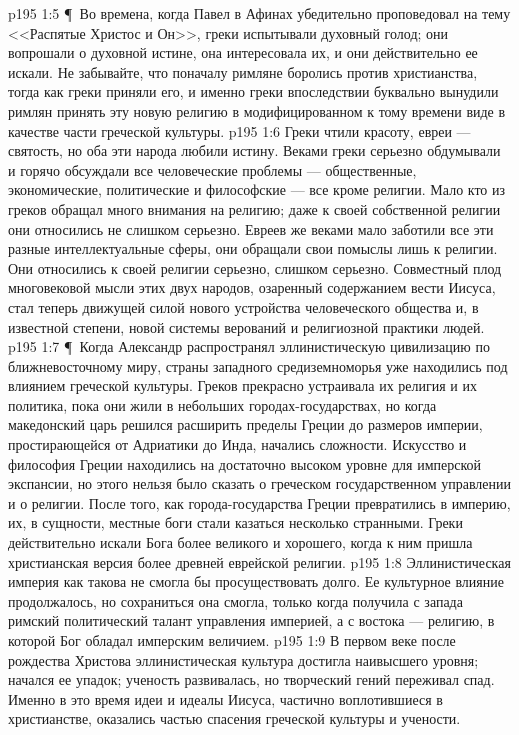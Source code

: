 \vs p195 1:5 \P\ Во времена, когда Павел в Афинах убедительно проповедовал на тему <<Распятые Христос и Он>>, греки испытывали духовный голод; они вопрошали о духовной истине, она интересовала их, и они действительно ее искали. Не забывайте, что поначалу римляне боролись против христианства, тогда как греки приняли его, и именно греки впоследствии буквально вынудили римлян принять эту новую религию в модифицированном к тому времени виде в качестве части греческой культуры.
\vs p195 1:6 Греки чтили красоту, евреи --- святость, но оба эти народа любили истину. Веками греки серьезно обдумывали и горячо обсуждали все человеческие проблемы --- общественные, экономические, политические и философские --- все кроме религии. Мало кто из греков обращал много внимания на религию; даже к своей собственной религии они относились не слишком серьезно. Евреев же веками мало заботили все эти разные интеллектуальные сферы, они обращали свои помыслы лишь к религии. Они относились к своей религии серьезно, слишком серьезно. Совместный плод многовековой мысли этих двух народов, озаренный содержанием вести Иисуса, стал теперь движущей силой нового устройства человеческого общества и, в известной степени, новой системы верований и религиозной практики людей.
\vs p195 1:7 \P\ Когда Александр распространял эллинистическую цивилизацию по ближневосточному миру, страны западного средиземноморья уже находились под влиянием греческой культуры. Греков прекрасно устраивала их религия и их политика, пока они жили в небольших городах\hyp{}государствах, но когда македонский царь решился расширить пределы Греции до размеров империи, простирающейся от Адриатики до Инда, начались сложности. Искусство и философия Греции находились на достаточно высоком уровне для имперской экспансии, но этого нельзя было сказать о греческом государственном управлении и о религии. После того, как города\hyp{}государства Греции превратились в империю, их, в сущности, местные боги стали казаться несколько странными. Греки действительно искали  Бога более великого и хорошего, когда к ним пришла христианская версия более древней еврейской религии.
\vs p195 1:8 Эллинистическая империя как такова не смогла бы просуществовать долго. Ее культурное влияние продолжалось, но сохраниться она смогла, только когда получила с запада римский политический талант управления империей, а с востока --- религию, в которой Бог обладал имперским величием.
\vs p195 1:9 В первом веке после рождества Христова эллинистическая культура достигла наивысшего уровня; начался ее упадок; ученость развивалась, но творческий гений переживал спад. Именно в это время идеи и идеалы Иисуса, частично воплотившиеся в христианстве, оказались частью спасения греческой культуры и учености.
